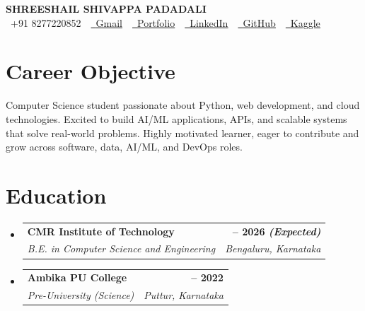 \documentclass[a4paper,11pt]{article}
\makeatletter
\newcommand{\resumeSubheading}[4]{%
  \vspace{-2pt}\item
  \begin{tabular*}{1.0\textwidth}{l@{\extracolsep{\fill}}r}
    \textbf{\color{accentblue}\fontsize{10.5pt}{12.5pt}\selectfont #1} &
      \textbf{\fontsize{10pt}{12pt}\selectfont #2} \\
    \textit{\fontsize{10pt}{12pt}\selectfont #3} &
      \textit{\fontsize{10pt}{12pt}\selectfont #4} \\
  \end{tabular*}\vspace{-7pt}%
}
\newcommand{\resumeSubHeadingListStart}{%
  \begin{itemize}[leftmargin=0.0in, label={}, itemsep=0pt, parsep=0pt, topsep=0pt]
}
\newcommand{\resumeSubHeadingListEnd}{\end{itemize}\vspace{-2pt}}
\makeatother
\begin{document}

\begin{center}
    {\fontsize{20pt}{24pt}\selectfont\scshape\bfseries\color{accentblue}%
      SHREESHAIL SHIVAPPA PADADALI} \\[3pt]
    \fontsize{10pt}{12pt}\selectfont
    \faPhone\ +91 8277220852 \,\textbar\,
    \href{mailto:shreeshailx@gmail.com}{\faEnvelope\ \underline{Gmail}} \,\textbar\,
    \href{https://shreeshail-sp.github.io/Portfolio/}{\faGlobe\ \underline{Portfolio}} \,\textbar\,
    \href{https://www.linkedin.com/in/shreeshailsp/}{\faLinkedin\ \underline{LinkedIn}} \,\textbar\,
    \href{https://github.com/Shreeshail-sp}{\faGithub\ \underline{GitHub}} \,\textbar\,
    \href{https://www.kaggle.com/shreeshail2004}{\faGlobe\ \underline{Kaggle}}
\end{center}
\vspace{-6pt}

\section{Career Objective}
{\fontsize{10pt}{12pt}\selectfont%
Computer Science student passionate about Python, web development, and cloud technologies.
Excited to build AI/ML applications, APIs, and scalable systems that solve real-world problems.
Highly motivated learner, eager to contribute and grow across software, data, AI/ML, and DevOps roles.\par}
\vspace{-3pt}

\section{Education}
\resumeSubHeadingListStart
  \resumeSubheading
    {CMR Institute of Technology}{2022 -- 2026 \textit{(Expected)}}
    {B.E. in Computer Science and Engineering}{Bengaluru, Karnataka}
  \resumeSubheading
    {Ambika PU College}{2020 -- 2022}
    {Pre-University (Science)}{Puttur, Karnataka}
\resumeSubHeadingListEnd

\end{document}
